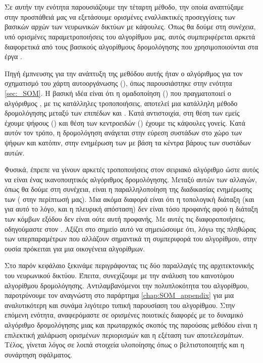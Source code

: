 \section{}

Σε αυτήν την ενότητα παρουσιάζουμε την τέταρτη μέθοδο, την οποία αναπτύξαμε στην προσπάθειά μας να εξετάσουμε ορισμένες εναλλακτικές προσεγγίσεις των βασικών αρχών των νευρωνικών δικτύων με κάψουλες. Όπως θα δούμε στη συνέχεια, υπό ορισμένες παραμετροποιήσεις του αλγορίθμου μας, αυτός συμπεριφέρεται αρκετά διαφορετικά από τους βασικούς αλγορίθμους δρομολόγησης που χρησιμοποιούνται στα έργα \cite{sabour2017dynamic,hinton2018matrix}.\par

Πηγή έμπνευσης για την ανάπτυξη της μεθόδου αυτής ήταν ο αλγόριθμος για τον σχηματισμό του χάρτη αυτο\textendash οργάνωσης (), όπως παρουσιάστηκε στην ενότητα \ref{sec:_SOM}. Η βασική ιδέα είναι ότι η ομαδοποίηση () που πραγματοποιεί ο αλγόριθμος , με τις κατάλληλες τροποποιήσεις, αποτελεί μια κατάλληλη μέθοδο δρομολόγησης μεταξύ των επιπέδων  και . Κατά αντιστοιχία, στη θέση των  εμείς έχουμε ψήφους () και  θέση των κεντροειδών () έχουμε τις κάψουλες γονείς. Κατά αυτόν τον τρόπο, η δρομολόγηση ανάγεται στην εύρεση συστάδων στο χώρο των ψήφων και κατόπιν, στην ενημέρωση των  με βάση τα κέντρα βάρους των συστάδων αυτών.\par

Φυσικά, έπρεπε να γίνουν αρκετές τροποποιήσεις στον σειριακό αλγόριθμο  ώστε αυτός να είναι ένας ικανοποιητικός αλγόριθμος δρομολόγησης. Μεταξύ αυτών των αλλαγών, όπως θα δούμε στη συνέχεια, είναι η παραλληλοποίηση της διαδικασίας ενημέρωσης των  ( στην περίπτωσή μας). Μια ακόμα διαφορά είναι ότι η τοπολογική διάταξη (και για αυτό το λόγο, και η πλευρική απόσταση) δεν είναι τόσο προφανής αφού η διάταξη των κόμβων εξόδου δεν είναι ούτε αυτή προφανής. Με αυτές τις διαφοροποιήσεις, οδηγούμαστε στον . Αξίζει στο σημείο αυτό να σημειώσουμε ότι, λόγω της πληθώρας των υπερπαραμέτρων που αλλάζουν σημαντικά τη συμπεριφορά του αλγορίθμου, στην ουσία πρόκειται για μια οικογένεια αλγορίθμων.\par

Στο παρόν κεφάλαιο ξεκινάμε περιγράφοντας τις δύο παραλλαγές της αρχιτεκτονικής του νευρωνικού δικτύου. Έπειτα, συνεχίζουμε με την ανάλυση του καινοτόμου αλγορίθμου δρομολόγησης. Αντιλαμβανόμενοι την πολυπλοκότητα του αλγορίθμου, παροτρύνουμε τον αναγνώστη στο παράρτημα \ref{chap:SOM_appendix} για μια αναλυτικότερη και συνάμα λιγότερο τυπική παρουσίαση του αλγορίθμου. Στην επόμενη ενότητα, αναφερόμαστε σε ορισμένες ποιοτικές διαφορές με το δυναμικό αλγόριθμο δρομολόγησης μιας και πρωταρχικός σκοπός της παρούσας μεθόδου είναι η επιλεκτική χαλάρωση ορισμένων περιορισμών και η εξέταση των αποτελεσμάτων. Τέλος, γίνεται λόγος σε λοιπά στοιχεία υλοποίησης όπως ο βελτιστοποιητής και η συνάρτηση σφάλματος. 


